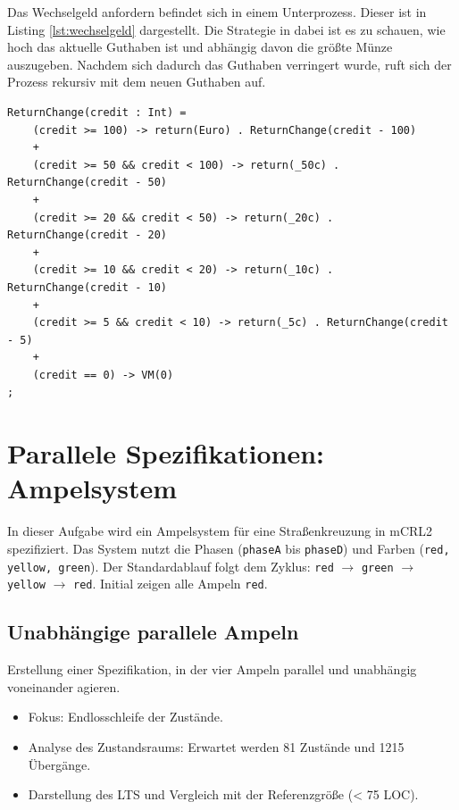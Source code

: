 \documentclass{article}
\begin{document}
Das Wechselgeld anfordern befindet sich in einem Unterprozess. Dieser ist in Listing \ref{lst:wechselgeld} dargestellt. Die Strategie in dabei ist es zu schauen, wie hoch das aktuelle Guthaben ist und abhängig davon die größte Münze auszugeben. Nachdem sich dadurch das Guthaben verringert wurde, ruft sich der Prozess rekursiv mit dem neuen Guthaben auf.

\begin{lstlisting}[caption={Prozess für die Rückgabe des Wechselgeldes},label={lst:wechselgeld}]
% Return the credit from high to low coins
ReturnChange(credit : Int) =
	(credit >= 100) -> return(Euro) . ReturnChange(credit - 100)
	+
	(credit >= 50 && credit < 100) -> return(_50c) . ReturnChange(credit - 50)
	+
	(credit >= 20 && credit < 50) -> return(_20c) . ReturnChange(credit - 20)
	+
	(credit >= 10 && credit < 20) -> return(_10c) . ReturnChange(credit - 10)
	+
	(credit >= 5 && credit < 10) -> return(_5c) . ReturnChange(credit - 5)
	+
	(credit == 0) -> VM(0)
;
\end{lstlisting}



\section{Parallele Spezifikationen: Ampelsystem}
In dieser Aufgabe wird ein Ampelsystem für eine Straßenkreuzung in mCRL2 spezifiziert. Das System nutzt die Phasen (\texttt{phaseA} bis \texttt{phaseD}) und Farben (\texttt{red, yellow, green}). Der Standardablauf folgt dem Zyklus: \texttt{red} $\rightarrow$ \texttt{green} $\rightarrow$ \texttt{yellow} $\rightarrow$ \texttt{red}. Initial zeigen alle Ampeln \texttt{red}.




\subsection{Unabhängige parallele Ampeln}
Erstellung einer Spezifikation, in der vier Ampeln parallel und unabhängig voneinander agieren.
\begin{itemize}
    \item Fokus: Endlosschleife der Zustände.
    \item Analyse des Zustandsraums: Erwartet werden 81 Zustände und 1215 Übergänge.
    \item Darstellung des LTS und Vergleich mit der Referenzgröße (< 75 LOC).
\end{itemize}
\end{document}
